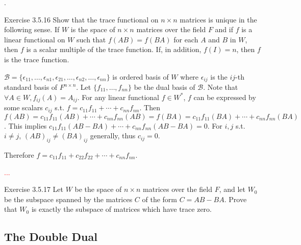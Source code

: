 \documentclass[8pt]{beamer}
\newcommand{\mc}[1]{\mathcal{#1}}
\begin{document}
\begin{frame}{.}

    \begin{block}{Exercise 3.5.16}    
        Show that the trace functional on $n \times n$ matrices is unique in the following sense.
        If $W$ is the space of $n \times n$ matrices over the field $F$ and if $f$ is a linear functional on $W$ such that $f(AB) = f(BA)$ for each $A$ and $B$ in $W$, then $f$ is a scalar multiple of the trace function.
        If, in addition, $f(I) = n$, then $f$ is the trace function.

        \smallskip
        $\mc{B} = \{\epsilon_{11}, \dots, \epsilon_{n1}, \epsilon_{21}, \dots, \epsilon_{n2}, \dots, \epsilon_{nn}\}$ is ordered basis of $W$ where $\epsilon_{ij}$ is the $ij$-th standard basis of $F^{n \times n}$.
        Let $\{f_{11}, \dots, f_{nn}\}$ be the dual basis of $\mc{B}$.
        Note that $\forall A \in W, f_{ij}(A) = A_{ij}$.
        For any linear functional $f \in W^\ast$, $f$ can be expressed by some scalars $c_{ij}$ s.t. $f = c_{11}f_{11} + \cdots +c_{nn} f_{nn}$.
        Then $f(AB) = c_{11} f_{11}(AB) + \cdots + c_{nn} f_{nn}(AB) = f(BA) = c_{11} f_{11}(BA) + \cdots + c_{nn} f_{nn}(BA)$.
        This implies $c_{11} f_{11} (AB - BA) + \cdots + c_{nn} f_{nn} (AB-BA) = 0$.
        For $i, j$ s.t. $i \neq j$, $(AB)_{ij} \neq (BA)_{ij}$ generally, thus $c_{ij} = 0$.

        Therefore $f = c_{11}f_{11} + c_{22}f_{22} + \cdots + c_{nn} f_{nn}$.


        \textcolor{red}{...}
    \end{block}

    \begin{block}{Exercise 3.5.17}
        Let $W$ be the space of $n \times n$ matrices over the field $F$, and let $W_0$ be the subspace spanned by the matrices $C$ of the form $C = AB - BA$.
        Prove that $W_0$ is exactly the subspace of matrices which have trace zero. 
    \end{block}
\end{frame}

\subsection{The Double Dual}
\end{document}
